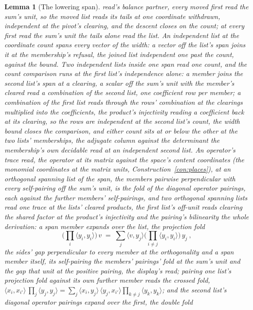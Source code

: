 \documentclass[11pt]{article}
\newtheorem{lemma}{Lemma}
\theoremstyle{definition}
\begin{document}
\begin{lemma}[The lowering span]
read's balance partner, every moved first read the sum's unit, so
the moved list reads its tails at one coordinate withdrawn,
independent at the pivot's clearing, and the descent closes on the
count; at every first read the sum's unit the tails alone read the
list. An independent list at the coordinate count spans every
vector of the width: a vector off the list's span joins it at the
membership's refusal, the joined list independent one past the
count, against the bound. Two independent lists inside one span read one count, and
the count comparison runs at the first list's independence alone:
a member joins the second list's span at a clearing, a scalar off
the sum's unit with the member's cleared read a combination of the
second list, one coefficient row per member; a combination of the
first list reads through the rows' combination at the clearings
multiplied into the coefficients, the product's injectivity
reading a coefficient back at its clearing, so the rows are
independent at the second list's count, the width bound closes the
comparison, and either count sits at or below the other at the two
lists' memberships, the adjugate column against the determinant
the membership's own decidable read at an independent second list.
An operator's \emph{trace read}, the operator at its matrix
against the space's content coordinates (the monomial coordinates
at the matrix units, Construction~\ref{con:places}), at an
orthogonal spanning list of
the span, the members pairwise perpendicular with every
self-pairing off the sum's unit, is the fold of the diagonal
operator pairings, each against the further members'
self-pairings, and two orthogonal spanning lists read one trace at
the lists' cleared products, the first list's off-unit reads
clearing the shared factor at the product's injectivity and the
pairing's bilinearity the whole derivation: a span member expands over the list, the
\emph{projection fold}
\[
\Big(\prod_i\langle y_i,y_i\rangle\Big)\,v
\;=\;\sum_j\langle v,y_j\rangle
\Big(\prod_{i\ne j}\langle y_i,y_i\rangle\Big)\,y_j\ ,
\]
the sides' gap perpendicular to every member at the orthogonality
and a span member itself, its self-pairing the members' pairings'
fold at the sum's unit and the gap that unit at the positive
pairing, the display's read; pairing one list's projection fold
against its own further member reads the \emph{crossed fold},
$\langle x_i,x_{i'}\rangle\,\prod_j\langle y_j,y_j\rangle
=\sum_j\langle x_i,y_j\rangle\,\langle y_j,x_{i'}\rangle
\prod_{k\ne j}\langle y_k,y_k\rangle$; and the second list's
diagonal operator pairings expand over the first, the double fold

\end{lemma}
\end{document}
